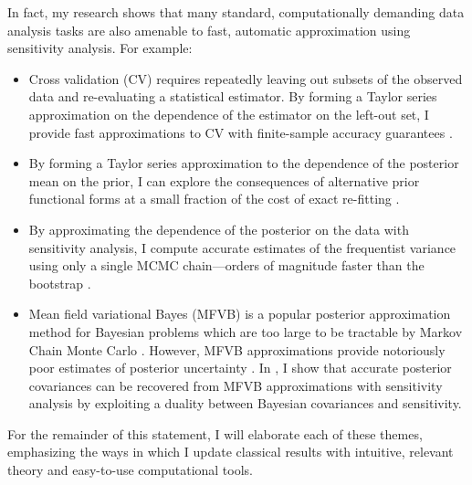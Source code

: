 In fact, my research shows that many standard, computationally demanding data
analysis tasks are also amenable to fast, automatic approximation using
sensitivity analysis. For example:
%
\begin{itemize}
\item Cross validation (CV) requires repeatedly leaving out subsets of the
observed data and re-evaluating a statistical estimator. By forming a Taylor
series approximation on the dependence of the estimator on the left-out set, I
provide fast approximations to CV with finite-sample accuracy guarantees
\citep{giordano:2019:ij}.
%
\item

By
forming a Taylor series approximation to the dependence of the posterior mean on
the prior, I can explore the consequences of alternative prior functional forms
at a small fraction of the cost of exact re-fitting
\citep{giordano:2020:rstansensitivity, giordano:2021:bnpsensitivity}.
%
\item


By approximating the dependence of the posterior on the data with
sensitivity analysis, I compute accurate estimates of the frequentist variance
using only a single MCMC chain---orders of magnitude faster than the bootstrap
\citep{giordano:2020:stanconbayesij}.
%
\item Mean field variational Bayes (MFVB) is a popular posterior approximation
method for Bayesian problems which are too large to be tractable by Markov Chain
Monte Carlo \citep{blei:2017:variational, regier:2019:cataloging}.  However,
MFVB approximations provide notoriously poor estimates of posterior uncertainty
\citep{turner:2011:two}.  In \citet{giordano:2018:covariances}, I show that
accurate posterior covariances can be recovered from MFVB approximations with
sensitivity analysis by exploiting a duality between Bayesian covariances and
sensitivity.
%
\end{itemize}

For the remainder of this statement, I will elaborate each of these themes,
emphasizing the ways in which I update classical results with intuitive,
relevant theory and easy-to-use computational tools.

\newpage
